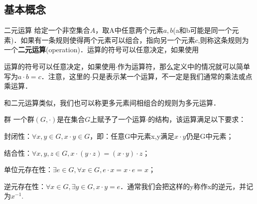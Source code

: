 
\subsection{基本概念}

\begin{definition}{二元运算}
给定一个非空集合$A$，取A中任意两个元素$a, b$(a和b可能是同一个元素)．如果有一条规则使得两个元素可以组合，指向另一个元素$c$,则称这条规则为一个\textbf{二元运算}(operation)．运算的符号可以任意决定，如果使用
\end{definition}

运算的符号可以任意决定，如果使用$\cdot$作为运算符，那么定义中的情况就可以简单写为$a\cdot b=c$．注意，这里的$\cdot$只是表示某一个运算，不一定是我们通常的乘法或点乘运算．

和二元运算类似，我们也可以称更多元素间相组合的规则为多元运算．

\begin{definition}{群}
一个群$(G, \cdot)$是在集合$G$上赋予了一个运算$\cdot$的结构，该运算满足以下要求：

封闭性：$\forall x, y\in G, x\cdot y\in G$，即：任意G中元素x,y满足$x\cdot y$仍是G中元素；

结合性：$\forall x, y, z\in G, x\cdot(y\cdot z)=(x\cdot y)\cdot z$；

单位元存在性：$\exists e\in G, \forall x\in G, e\cdot x=x\cdot e=x$；

逆元存在性：$\forall x\in G, \exists y\in G, x\cdot y=e$．通常我们会把这样的y称作x的逆元，并记为$x^{-1}$. 

\end{definition}